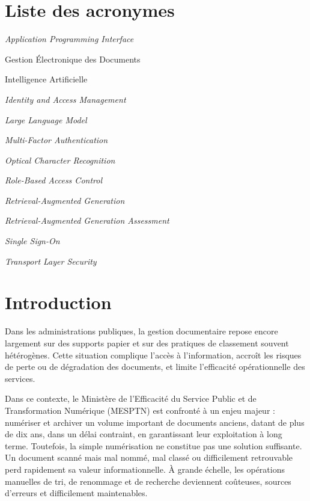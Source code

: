 \documentclass[12pt,a4paper]{report}
\newcommand{\nomMinistere}{Ministère de l'Efficacité du Service Public et de Transformation Numérique (MESPTN)}
\begin{document}
\chapter*{Liste des acronymes}
\begin{description}[leftmargin=2.5cm, style=nextline]
  \item[API] \textit{Application Programming Interface}
  \item[GED] Gestion Électronique des Documents
  \item[IA] Intelligence Artificielle
  \item[IAM] \textit{Identity and Access Management}
  \item[LLM] \textit{Large Language Model}
  \item[MFA] \textit{Multi-Factor Authentication}
  \item[OCR] \textit{Optical Character Recognition}
  \item[RBAC] \textit{Role-Based Access Control}
  \item[RAG] \textit{Retrieval-Augmented Generation}
  \item[RAGAS] \textit{Retrieval-Augmented Generation Assessment}
  \item[SSO] \textit{Single Sign-On}
  \item[TLS] \textit{Transport Layer Security}
\end{description}

\clearpage
\listoffigures
\clearpage
\listoftables
\clearpage
\tableofcontents
\clearpage

\pagestyle{main}

\chapter*{Introduction}
Dans les administrations publiques, la gestion documentaire repose encore largement sur des supports papier et sur des pratiques de classement souvent hétérogènes. Cette situation complique l’accès à l’information, accroît les risques de perte ou de dégradation des documents, et limite l’efficacité opérationnelle des services.

Dans ce contexte, le \nomMinistere{} est confronté à un enjeu majeur : numériser et archiver un volume important de documents anciens, datant de plus de dix ans, dans un délai contraint, en garantissant leur exploitation à long terme. Toutefois, la simple numérisation ne constitue pas une solution suffisante. Un document scanné mais mal nommé, mal classé ou difficilement retrouvable perd rapidement sa valeur informationnelle. À grande échelle, les opérations manuelles de tri, de renommage et de recherche deviennent coûteuses, sources d’erreurs et difficilement maintenables.
\end{document}
